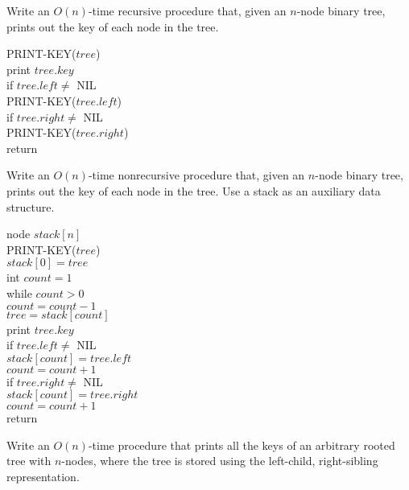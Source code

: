 \documentclass[12pt, a4paper, UTF8]{ctexart}
\begin{document}
\begin{problem}[TC: 10.4-2]
  Write an $O(n)$-time recursive procedure that, given an $n$-node binary tree, 
  prints out the key of each node in the tree.
\end{problem}

\begin{solution}
  PRINT-KEY($tree$)\\
  \indent print $tree.key$\\
  \indent if $tree.left\neq$ NIL\\
  \indent\indent PRINT-KEY($tree.left$)\\
  \indent if $tree.right\neq$ NIL\\
  \indent\indent PRINT-KEY($tree.right$)\\
  \indent return
\end{solution}

\begin{problem}[TC: 10.4-3]
  Write an $O(n)$-time nonrecursive procedure that, given an $n$-node binary tree, 
  prints out the key of each node in the tree. Use a stack as an auxiliary data 
  structure.
\end{problem}

\begin{solution}
  node $stack[n]$\\
  PRINT-KEY($tree$)\\
  \indent $stack[0] = tree$\\
  \indent int $count = 1$\\
  \indent while $count > 0$\\
  \indent\indent $count = count - 1$\\
  \indent\indent $tree = stack[count]$\\
  \indent\indent print $tree.key$\\
  \indent\indent if $tree.left\neq$ NIL\\
  \indent\indent\indent $stack[count] = tree.left$\\
  \indent\indent\indent $count = count + 1$\\
  \indent\indent if $tree.right\neq$ NIL\\
  \indent\indent\indent $stack[count] = tree.right$\\
  \indent\indent\indent $count = count + 1$\\
  \indent return
\end{solution}

\begin{problem}[TC: 10.4-4]
  Write an $O(n)$-time procedure that prints all the keys of an arbitrary rooted 
  tree with $n$-nodes, where the tree is stored using the left-child, right-sibling 
  representation.
\end{problem}
\end{document}
